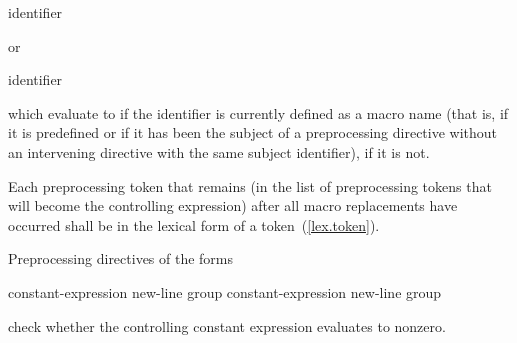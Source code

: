 \begin{ncbnf}
 identifier
\end{ncbnf}

or

\begin{ncbnf}
 identifier \terminal{)}
\end{ncbnf}

which evaluate to
if the identifier is currently defined
as a macro name
(that is, if it is predefined
or if it has been the subject of a
preprocessing directive
without an intervening
directive with the same subject identifier),  if it is not.

\pnum
Each preprocessing token that remains (in the list of preprocessing tokens that
will become the controlling expression)
after all macro replacements have occurred
shall be in the lexical form of a token~(\ref{lex.token}).

\pnum
Preprocessing directives of the forms

\begin{ncbnftab}
%
\>\>constant-expression new-line group\opt\br
{}%
\>\>constant-expression new-line group\opt
\end{ncbnftab}

check whether the controlling constant expression evaluates to nonzero.

